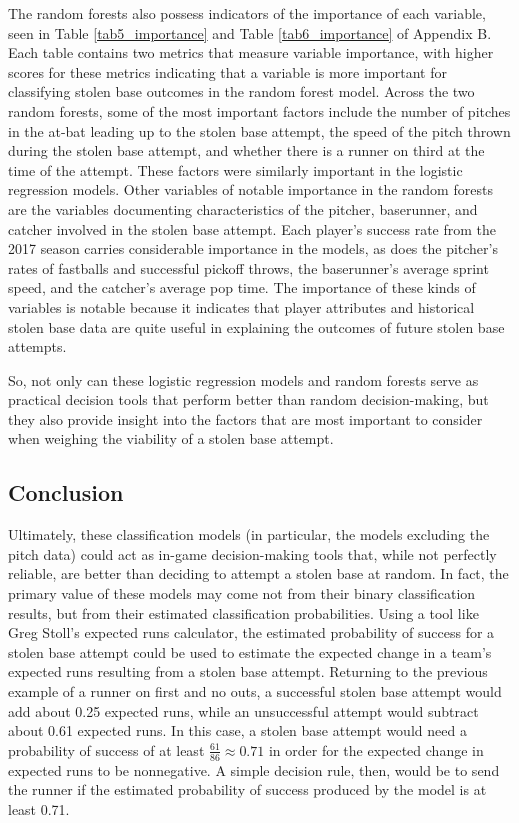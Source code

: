 \documentclass{article}
\begin{document}
The random forests also possess indicators of the importance of each variable, seen in Table \ref{tab5_importance} and Table \ref{tab6_importance} of Appendix B. Each table contains two metrics that measure variable importance, with higher scores for these metrics indicating that a variable is more important for classifying stolen base outcomes in the random forest model. Across the two random forests, some of the most important factors include the number of pitches in the at-bat leading up to the stolen base attempt, the speed of the pitch thrown during the stolen base attempt, and whether there is a runner on third at the time of the attempt. These factors were similarly important in the logistic regression models. Other variables of notable importance in the random forests are the variables documenting characteristics of the pitcher, baserunner, and catcher involved in the stolen base attempt. Each player's success rate from the 2017 season carries considerable importance in the models, as does the pitcher's rates of fastballs and successful pickoff throws, the baserunner's average sprint speed, and the catcher's average pop time. The importance of these kinds of variables is notable because it indicates that player attributes and historical stolen base data are quite useful in explaining the outcomes of future stolen base attempts.

So, not only can these logistic regression models and random forests serve as practical decision tools that perform better than random decision-making, but they also provide insight into the factors that are most important to consider when weighing the viability of a stolen base attempt.


\newpage
\begin{center}
    \section{Conclusion}
\end{center}
Ultimately, these classification models (in particular, the models excluding the pitch data) could act as in-game decision-making tools that, while not perfectly reliable, are better than deciding to attempt a stolen base at random. In fact, the primary value of these models may come not from their binary classification results, but from their estimated classification probabilities. Using a tool like Greg Stoll’s expected runs calculator, the estimated probability of success for a stolen base attempt could be used to estimate the expected change in a team’s expected runs resulting from a stolen base attempt. Returning to the previous example of a runner on first and no outs, a successful stolen base attempt would add about 0.25 expected runs, while an unsuccessful attempt would subtract about 0.61 expected runs. In this case, a stolen base attempt would need a probability of success of at least $\frac{61}{86} \approx 0.71$ in order for the expected change in expected runs to be nonnegative. A simple decision rule, then, would be to send the runner if the estimated probability of success produced by the model is at least 0.71.
\end{document}
